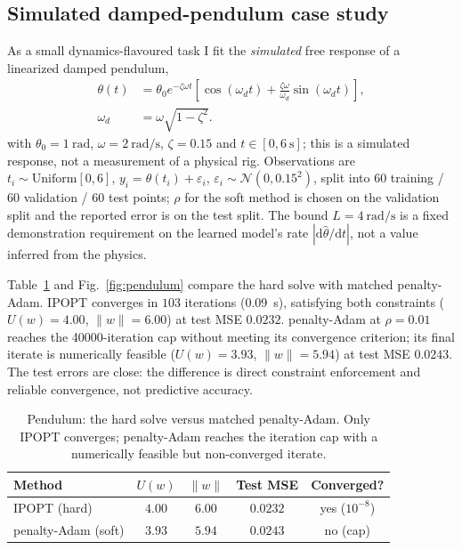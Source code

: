 \documentclass[conference]{IEEEtran}
\newcommand{\wvec}{w}
\newcommand{\Lmax}{L}
\newcommand{\Uc}{U(\wvec)}
\newcommand{\norm}[1]{\lVert #1 \rVert}
\begin{document}
\subsection{Simulated damped-pendulum case study}\label{sec:pend}
As a small dynamics-flavoured task I fit the \emph{simulated} free response of a
linearized damped pendulum,
\begin{equation}
\begin{aligned}
\theta(t)
&=\theta_0 e^{-\zeta\omega t}
\left[\cos(\omega_d t)
+\frac{\zeta\omega}{\omega_d}\sin(\omega_d t)\right],\\
\omega_d
&=\omega\sqrt{1-\zeta^2}.
\end{aligned}
\label{eq:pend}
\end{equation}
with $\theta_0=\SI{1}{\radian}$, $\omega=\SI{2}{\radian\per\second}$, $\zeta=0.15$
and $t\in[0,\SI{6}{\second}]$; this is a simulated response, not a measurement of a
physical rig. Observations are $t_i\sim\mathrm{Uniform}[0,6]$,
$y_i=\theta(t_i)+\varepsilon_i$, $\varepsilon_i\sim\mathcal N(0,0.15^2)$, split into
$60$ training / $60$ validation / $60$ test points; $\rho$ for the soft method is
chosen on the validation split and the reported error is on the test split. The
bound $\Lmax=\SI{4}{\radian\per\second}$ is a fixed demonstration requirement on the
learned model's rate $|\mathrm d\hat\theta/\mathrm dt|$, not a value inferred from the
physics.

Table~\ref{tab:pend} and Fig.~\ref{fig:pendulum} compare the hard solve with matched
penalty-Adam. IPOPT converges in $103$ iterations (\SI{0.09}{\second}), satisfying
both constraints ($\Uc=4.00$, $\norm{\wvec}=6.00$) at test MSE $0.0232$.
penalty-Adam at $\rho=0.01$ reaches the \num{40000}-iteration cap without meeting its
convergence criterion; its final iterate is numerically feasible ($\Uc=3.93$,
$\norm{\wvec}=5.94$) at test MSE $0.0243$. The test errors are close: the difference
is direct constraint enforcement and reliable convergence, not predictive accuracy.

\begin{table}[t]
\caption{Pendulum: the hard solve versus matched penalty-Adam. Only IPOPT converges;
penalty-Adam reaches the iteration cap with a numerically feasible but non-converged
iterate.}
\label{tab:pend}
\centering\setlength{\tabcolsep}{6pt}\footnotesize
\begin{tabular}{@{}lcccc@{}}
\toprule
Method & $\Uc$ & $\norm{\wvec}$ & Test MSE & Converged?\\
\midrule
IPOPT (hard)        & $4.00$ & $6.00$ & $0.0232$ & yes ($10^{-8}$)\\
penalty-Adam (soft) & $3.93$ & $5.94$ & $0.0243$ & no (cap)\\
\bottomrule
\end{tabular}
\end{table}
\end{document}
